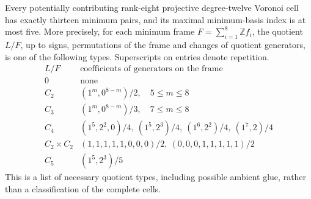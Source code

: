 \begin{corollary}[K17-K12-R8-INDEX5]
\label{cor:k12-r8-index-five}
Every potentially contributing rank-eight projective degree-twelve
Voronoi cell has exactly thirteen minimum pairs, and its maximal
minimum-basis index is at most five. More precisely, for each minimum
frame $F=\sum_{i=1}^8\mathbb Zf_i$, the quotient $L/F$, up to signs,
permutations of the frame and changes of quotient generators, is one
of the following types. Superscripts on entries denote repetition.
\[
\begin{array}{c|l}
 L/F & \text{coefficients of generators on the frame}\\ \hline
 0 & \text{none}\\
 C_2 &(1^m,0^{8-m})/2,\quad 5\leq m\leq8\\
 C_3 &(1^m,0^{8-m})/3,\quad 7\leq m\leq8\\
 C_4 &(1^5,2^2,0)/4,\ (1^5,2^3)/4,\
       (1^6,2^2)/4,\ (1^7,2)/4\\
 C_2\times C_2 &(1,1,1,1,1,0,0,0)/2,\
                 (0,0,0,1,1,1,1,1)/2\\
 C_5 &(1^5,2^3)/5
\end{array}
\]
This is a list of necessary quotient types, including possible
ambient glue, rather than a classification of the complete cells.
\end{corollary}

